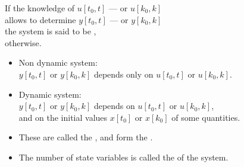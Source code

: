 \begin{frame}
\myPause
\begin{center}
 {\Large
 If the knowledge of $u[t_0,t]$ --- or $u[k_0,k]$ \\ \myPause
 allows to determine $y[t_0,t]$ --- or $y[k_0,k]$ \\ \myPause
 the system is said to be ,\\ \myPause
 \vspace{1.5mm} otherwise. \myPause
 }
\end{center}
\end{frame}

\begin{frame}
\myPause
\begin{itemize}[<+-| alert@+>]
\item Non dynamic system:\\
      $y[t_0,t]$ or $y[k_0,k]$ depends only on $u[t_0,t]$ or $u[k_0,k]$.
\item Dynamic system:\\
      $y[t_0,t]$ or $y[k_0,k]$ depends on $u[t_0,t]$ or $u[k_0,k]$,\\
      and on the initial values $x[t_0]$ or $x[k_0]$ of some quantities.
\item These are called the , and form the .
\item The number of state variables is called the  of the system.
\end{itemize}
\end{frame}

